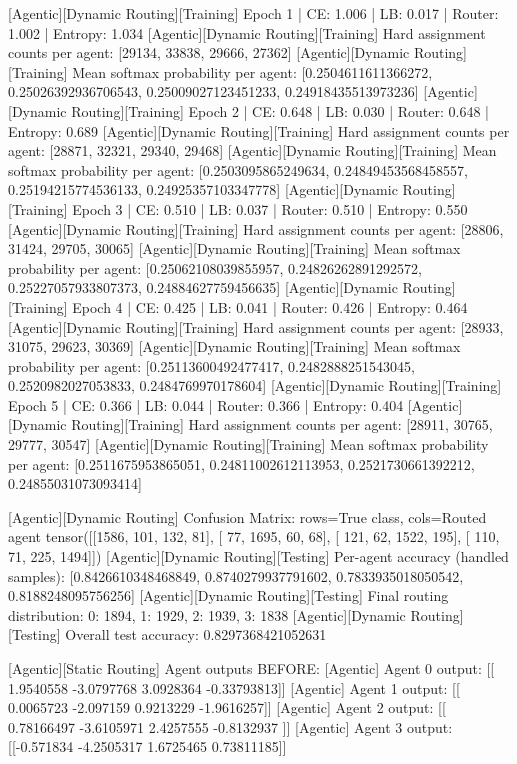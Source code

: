 [Agentic][Dynamic Routing][Training] Epoch 1 | CE: 1.006 | LB: 0.017 | Router: 1.002 | Entropy: 1.034
[Agentic][Dynamic Routing][Training] Hard assignment counts per agent: [29134, 33838, 29666, 27362]
[Agentic][Dynamic Routing][Training] Mean softmax probability per agent: [0.2504611611366272, 0.25026392936706543, 0.25009027123451233, 0.24918435513973236]
[Agentic][Dynamic Routing][Training] Epoch 2 | CE: 0.648 | LB: 0.030 | Router: 0.648 | Entropy: 0.689
[Agentic][Dynamic Routing][Training] Hard assignment counts per agent: [28871, 32321, 29340, 29468]
[Agentic][Dynamic Routing][Training] Mean softmax probability per agent: [0.2503095865249634, 0.24849453568458557, 0.25194215774536133, 0.24925357103347778]
[Agentic][Dynamic Routing][Training] Epoch 3 | CE: 0.510 | LB: 0.037 | Router: 0.510 | Entropy: 0.550
[Agentic][Dynamic Routing][Training] Hard assignment counts per agent: [28806, 31424, 29705, 30065]
[Agentic][Dynamic Routing][Training] Mean softmax probability per agent: [0.25062108039855957, 0.24826262891292572, 0.25227057933807373, 0.24884627759456635]
[Agentic][Dynamic Routing][Training] Epoch 4 | CE: 0.425 | LB: 0.041 | Router: 0.426 | Entropy: 0.464
[Agentic][Dynamic Routing][Training] Hard assignment counts per agent: [28933, 31075, 29623, 30369]
[Agentic][Dynamic Routing][Training] Mean softmax probability per agent: [0.25113600492477417, 0.2482888251543045, 0.2520982027053833, 0.2484769970178604]
[Agentic][Dynamic Routing][Training] Epoch 5 | CE: 0.366 | LB: 0.044 | Router: 0.366 | Entropy: 0.404
[Agentic][Dynamic Routing][Training] Hard assignment counts per agent: [28911, 30765, 29777, 30547]
[Agentic][Dynamic Routing][Training] Mean softmax probability per agent: [0.2511675953865051, 0.24811002612113953, 0.2521730661392212, 0.24855031073093414]

[Agentic][Dynamic Routing] Confusion Matrix: rows=True class, cols=Routed agent
tensor([[1586,  101,  132,   81],
[  77, 1695,   60,   68],
[ 121,   62, 1522,  195],
[ 110,   71,  225, 1494]])
[Agentic][Dynamic Routing][Testing] Per-agent accuracy (handled samples): [0.8426610348468849, 0.8740279937791602, 0.7833935018050542, 0.8188248095756256]
[Agentic][Dynamic Routing][Testing] Final routing distribution: {0: 1894, 1: 1929, 2: 1939, 3: 1838}
[Agentic][Dynamic Routing][Testing] Overall test accuracy: 0.8297368421052631

[Agentic][Static Routing] Agent outputs BEFORE:
[Agentic] Agent 0 output: [[ 1.9540558  -3.0797768   3.0928364  -0.33793813]]
[Agentic] Agent 1 output: [[ 0.0065723 -2.097159   0.9213229 -1.9616257]]
[Agentic] Agent 2 output: [[ 0.78166497 -3.6105971   2.4257555  -0.8132937 ]]
[Agentic] Agent 3 output: [[-0.571834   -4.2505317   1.6725465   0.73811185]]

